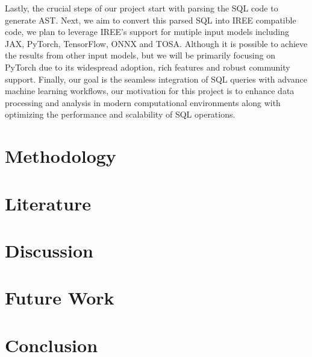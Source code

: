 \documentclass{article}
\begin{document}
Lastly, the crucial steps of our project start with parsing the SQL code to generate AST. Next, we aim to convert this parsed SQL into IREE compatible code, we plan to leverage IREE's support for mutiple input models including JAX, PyTorch, TensorFlow, ONNX and TOSA. Although it is possible to achieve the results from other input models, but we will be primarily focusing on PyTorch due to its widespread adoption, rich features and robust community support. Finally, our goal is the seamless integration of SQL queries with advance machine learning workflows, our motivation for this project is to enhance data processing and analysis in modern computational environments along with optimizing the performance and scalability of SQL operations.
\section{Methodology}
\section{Literature}
\section{Discussion}
\section{Future Work}
\section {Conclusion}       
\end{document}

